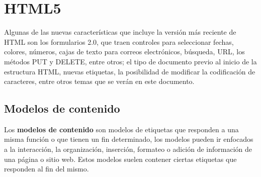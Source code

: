 \section{HTML5}

Algunas de las nuevas características que incluye la versión más reciente de HTML son los formularios 2.0, que traen controles para seleccionar fechas, colores, números, cajas de texto para correos electrónicos, búsqueda, URL, los métodos PUT y DELETE, entre otros; el tipo de documento previo al inicio de la estructura HTML, nuevas etiquetas, la posibilidad de modificar la codificación de caracteres, entre otros temas que se verán en este documento.


\subsection{Modelos de contenido}

Los \textbf{modelos de contenido} son modelos de etiquetas que responden a una misma función o que tienen un fin determinado, los modelos pueden ir enfocados a la interacción, la organización, inserción, formateo o adición de información de una página o sitio web. Estos modelos suelen contener ciertas etiquetas que responden al fin del mismo.

